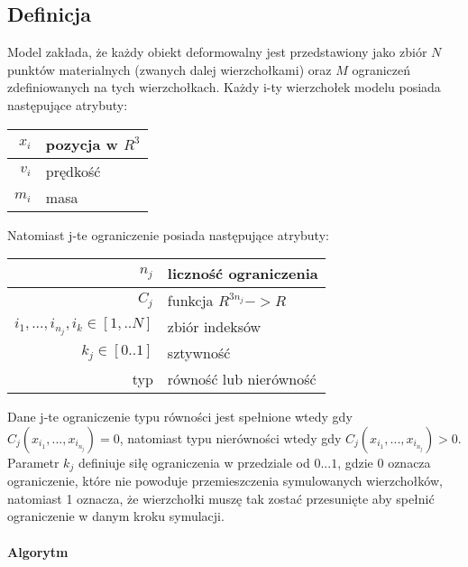\subsection{Definicja}
Model zakłada, że każdy obiekt deformowalny jest przedstawiony jako zbiór $N$
punktów materialnych (zwanych dalej wierzchołkami) oraz $M$ ograniczeń
zdefiniowanych na tych wierzchołkach. Każdy i-ty wierzchołek modelu posiada
następujące atrybuty:

\centering
\begin{tabular}{|r|l|}
\hline
$x_i$ & pozycja w $R^3$ \\
\hline
$v_i$ & prędkość \\
\hline
$m_i$ & masa\\
\hline
\end{tabular}

\raggedright
Natomiast j-te ograniczenie posiada następujące atrybuty:

\centering
\begin{tabular}{|r|l|}
\hline
$n_j$ & liczność ograniczenia \\
\hline
$C_j$ & funkcja $R^{3n_j} -> R$\\
\hline
${i_1, ..., i_{n_j}}, i_k \in [1,..N]$ & zbiór indeksów\\
\hline
$k_j \in [0.. 1]$ & sztywność\\
\hline
typ & równość lub nierówność\\
\hline
\end{tabular}

\raggedright
Dane j-te ograniczenie typu równości jest spełnione wtedy gdy $C_j(x_{i_1},...,
		x_{i_{n_j}}) = 0$, natomiast typu nierówności wtedy gdy $C_j(x_{i_1},...,
		x_{i_{n_j}}) > 0$. Parametr $k_j$ definiuje siłę ograniczenia w
		przedziale od $0...1$, gdzie 0 oznacza ograniczenie, które nie powoduje
		przemieszczenia symulowanych wierzchołków, natomiast 1 oznacza, że
		wierzchołki muszę tak zostać przesunięte aby spełnić ograniczenie w
		danym kroku symulacji.

\paragraph{Algorytm}

